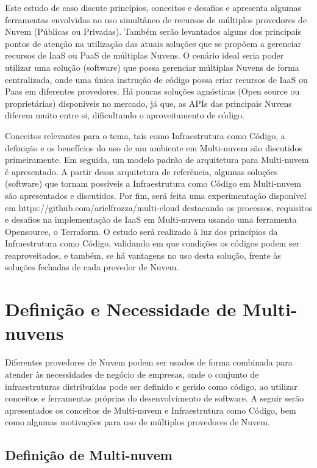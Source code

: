 \documentclass[12pt]{article}
\begin{document}
	    Este estudo de caso discute princípios, conceitos e desafios e apresenta algumas ferramentas envolvidas no uso simultâneo de recursos de múltiplos provedores de Nuvem (Públicas ou Privadas). Também serão levantados alguns dos principais pontos de atenção na utilização das atuais soluções que se propõem a gerenciar recursos de IaaS ou PaaS de múltiplas Nuvens. O cenário ideal seria poder utilizar uma solução (software) que possa gerenciar múltiplas Nuvens de forma centralizada, onde uma única instrução de código possa criar recursos de IaaS ou Paas em diferentes provedores. Há poucas soluções agnósticas (Open source ou proprietárias) disponíveis no mercado, já que, as APIs das principais Nuvens diferem muito entre si, dificultando o aproveitamento de código.
	    
	    Conceitos relevantes para o tema, tais como Infraestrutura como Código, a definição e os benefícios do uso de um ambiente em Multi-nuvem são discutidos primeiramente. Em seguida, um modelo padrão de arquitetura para Multi-nuvem é apresentado. A partir dessa arquitetura de referência, algumas soluções (software) que tornam possíveis a Infraestrutura como Código em Multi-nuvem são apresentados e discutidos. Por fim, será feita uma experimentação disponível em https://github.com/arielfrozza/multi-cloud destacando os processos, requisitos e desafios na implementação de IaaS em Multi-nuvem usando uma ferramenta Opensource, o Terraform. O estudo será realizado à luz dos princípios da Infraestrutura como Código, validando em que condições os códigos podem ser reaproveitados, e também, se há vantagens no uso desta solução, frente às soluções fechadas de cada provedor de Nuvem.
		
	\section{Definição e Necessidade de Multi-nuvens}
	
	Diferentes provedores de Nuvem podem ser usados de forma combinada para atender às necessidades de negócio de empresas, onde o conjunto de infraestruturas distribuídas pode ser definido e gerido como código, ao utilizar conceitos e ferramentas próprias do desenvolvimento de software. A seguir serão apresentados os conceitos de Multi-nuvem e Infraestrutura como Código, bem como algumas motivações para uso de múltiplos provedores de Nuvem.
	
	\subsection{Definição de Multi-nuvem}
	
\end{document}
